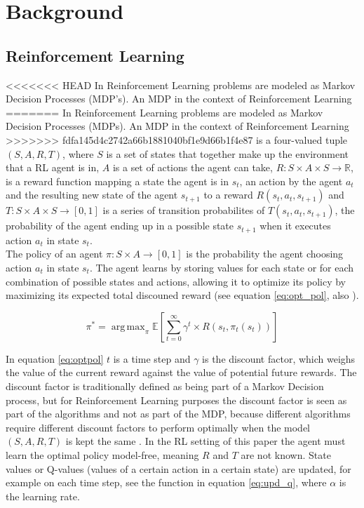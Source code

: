 
\section{Background}

\subsection{Reinforcement Learning}

<<<<<<< HEAD
In Reinforcement Learning problems are modeled as Markov Decision Processes (MDP's). An MDP in the context of Reinforcement Learning
=======
In Reinforcement Learning problems are modeled as Markov Decision Processes (MDPs). An MDP in the context of Reinforcement Learning
>>>>>>> fdfa145d4c2742a66b1881040bf1e9d66b1f4e87
is a four-valued tuple $(S,A,R,T)$, where $S$ is a set of states that together make up the environment that a RL agent is in,
 $A$ is a set of actions the agent can take, $R: S \times A \times S \rightarrow \mathbb{R}$, is a reward function mapping a state the agent is in $s_t$,
 an action by the agent $a_t$ and the resulting new state of the agent $s_{t+1}$ to a reward $R(s_t,a_t,s_{t+1})$
 and $T: S \times A \times S \rightarrow [0,1]$ is a series of transition probabilites of $T(s_t,a_t,s_{t+1})$, the probability of the agent
 ending up in a possible state $s_{t+1}$ when it executes action $a_t$ in state $s_t$. \\
 The policy of an agent $\pi: S \times A \rightarrow [0,1]$ is the probability the agent choosing action $a_t$ in state $s_t$. The agent learns by storing values for each
 state or for each combination of possible states and actions, allowing it to optimize its policy by maximizing its expected total discouned reward
 (see equation \ref{eq:opt_pol}, also \cite{zimmer2016neural}).

\begin{equation}
\label{eq:opt_pol}
\pi^* = \operatorname{arg\,max}_{\pi} \mathbb{E}\left [ \sum_{t = 0}^{\infty}\gamma^{t} \times R(s_t,\pi_t(s_t))\right ]
\end{equation}

In equation \eqref{eq:optpol} $t$ is a time step and $\gamma$ is the discount factor, which weighs the value of the current reward against the value of potential future rewards.
The discount factor is traditionally defined as being part of a Markov Decision process, but for Reinforcement Learning purposes the discount factor is seen as part
of the algorithms and not as part of the MDP, because different algorithms require different discount factors to perform optimally when the model
$(S,A,R,T)$ is kept the same \cite{van2007reinforcement}. In the RL setting of this paper the agent must learn the optimal policy model-free, meaning $R$ and $T$ are not known.
State values or Q-values (values of a certain action in a certain state) are updated, for example on each time step, see the function in equation \ref{eq:upd_q}, where $\alpha$ is the learning rate.

